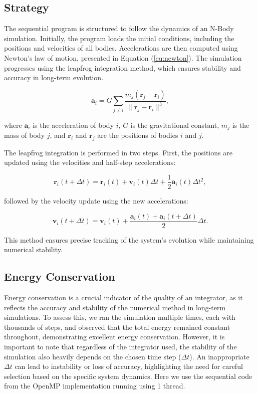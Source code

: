 \documentclass[english,11pt]{article}
\begin{document}
\subsection{Strategy}

The sequential program is structured to follow the dynamics of an N-Body simulation. Initially, the program loads the initial conditions, including the positions and velocities of all bodies. Accelerations are then computed using Newton's law of motion, presented in Equation (\ref{eq:newton}). The simulation progresses using the leapfrog integration method, which ensures stability and accuracy in long-term evolution.

\begin{equation}
    \mathbf{a}_i = G \sum_{j \neq i} \frac{m_j (\mathbf{r}_j - \mathbf{r}_i)}{\|\mathbf{r}_j - \mathbf{r}_i\|^3},
    \label{eq:newton}
\end{equation}

where $\mathbf{a}_i$ is the acceleration of body $i$, $G$ is the gravitational constant, $m_j$ is the mass of body $j$, and $\mathbf{r}_i$ and $\mathbf{r}_j$ are the positions of bodies $i$ and $j$.

The leapfrog integration is performed in two steps. First, the positions are updated using the velocities and half-step accelerations:

\begin{equation}
    \mathbf{r}_i(t + \Delta t) = \mathbf{r}_i(t) + \mathbf{v}_i(t) \Delta t + \frac{1}{2} \mathbf{a}_i(t) \Delta t^2,
    \label{eq:leapfrog1}
\end{equation}

followed by the velocity update using the new accelerations:

\begin{equation}
    \mathbf{v}_i(t + \Delta t) = \mathbf{v}_i(t) + \frac{\mathbf{a}_i(t) + \mathbf{a}_i(t + \Delta t)}{2} \Delta t.
    \label{eq:leapfrog2}
\end{equation}

This method ensures precise tracking of the system's evolution while maintaining numerical stability. 


\subsection{Energy Conservation}
Energy conservation is a crucial indicator of the quality of an integrator, as it reflects the accuracy and stability of the numerical method in long-term simulations. To assess this, we ran the simulation multiple times, each with thousands of steps, and observed that the total energy remained constant throughout, demonstrating excellent energy conservation. However, it is important to note that regardless of the integrator used, the stability of the simulation also heavily depends on the chosen time step (\( \Delta t \)). An inappropriate \(\Delta t\) can lead to instability or loss of accuracy, highlighting the need for careful selection based on the specific system dynamics. Here we use the sequential code from the OpenMP implementation running using 1 thread.
\end{document}
